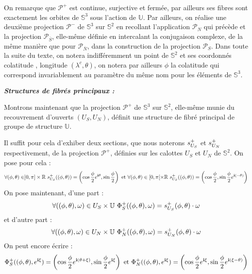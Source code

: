 On remarque que $\mathcal{P}^+$ est continue, surjective et ferm\'ee, par ailleurs ses fibres sont exactement les orbites de $\mathbb{S}^3$ sous l'action de $\mathbb{U}$.
\ligneinter
Par ailleurs, on r\'ealise une deuxi\`eme projection $\mathcal{P}^-$ de $\mathbb{S}^3$ sur $\mathbb{S}^2$ en recollant l'application $\mathcal{P}_N$ qui pr\'ec\`ede %
et la projection $\mathcal{P}_{\overline{S}}$, elle-m\^eme d\'efinie en intercalant la conjugaison complexe, %
de la m\^eme mani\`ere que pour $\mathcal{P}_{\overline{N}}$, dans la construction de la projection $\mathcal{P}_S$.
\etoile
Dans toute la suite du texte, on notera indiff\'eremment un point de $\mathbb{S}^2$ et ses coordonn\'es \og{}colatitude , longitude\fg{} $(\lambda^c,\theta)$, %
on notera par ailleurs $\phi$ la colatitude qui correspond invariablement au param\`etre du m\^eme nom pour les \'el\'ements de $\mathbb{S}^3$.
\par
\emph{\textbf{Structures de fibr\'es principaux :}}
\par
Montrons maintenant que la projection $\mathcal{P}^+$ de $\mathbb{S}^3$ sur $\mathbb{S}^2$, elle-m\^eme munie du recouvrement d'ouverts $(U_S,U_N)$, %
d\'efinit une structure de fibr\'e principal de groupe de structure $\mathbb{U}$.
\par
Il suffit pour cela d'exhiber deux sections, que nous noterons $s_{U_{S}}^{+}$ et $s_{U_{N}}^{+}$ respectivement, %
de la projection $\mathcal{P}^+$, d\'efinies sur les calottes $U_S$ et $U_N$ de $\mathbb{S}^2$. On pose pour cela :
\[\forall (\phi,\theta)\in]0,\pi]\times\mathbb{R}\ \se{S}{+}((\phi,\theta))=\left(\cos\dfrac{\phi}{2}\ec{\theta},\sin\dfrac{\phi}{2}\right)\text{ et }%
\forall (\phi,\theta)\in[0,\pi[\times\mathbb{R}\ \se{S}{+}((\phi,\theta))=\left(\cos\dfrac{\phi}{2},\sin\dfrac{\phi}{2}\ec{(-\theta)}\right)\]
On pose maintenant, d'une part :
\[\forall ((\phi,\theta),\omega)\in U_S\times\mathbb{U}\ \Phi_S^+((\phi,\theta),\omega)=s_{U_{S}}^{+}(\phi,\theta)\cdot\omega\]%
et d'autre part :
\[\forall ((\phi,\theta),\omega)\in U_N\times\mathbb{U}\ \Phi_N^+((\phi,\theta),\omega)=s_{U_{N}}^{+}(\phi,\theta)\cdot\omega\]%
On peut encore \'ecrire :
\[\Phi_S^+((\phi,\theta),\ec{\xi})=\st{\phi}{(\theta+\xi)}{\xi}\text{ et }%
\Phi_N^+((\phi,\theta),\ec{\xi})=\st{\phi}{\xi}{(\xi-\theta)}\]
